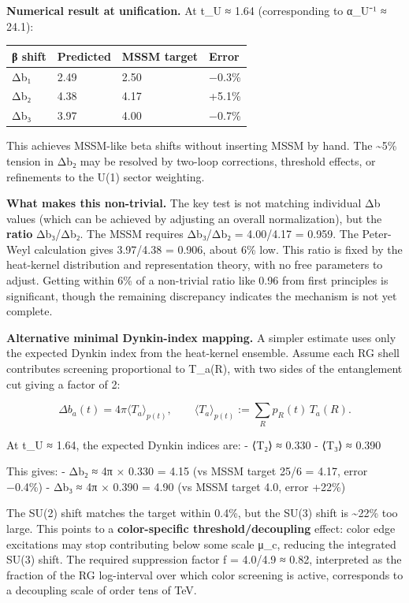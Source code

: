 \documentclass[
]{article}
\newcounter{none} %
\begin{document}
\textbf{Numerical result at unification.} At t\_U ≈ 1.64 (corresponding
to α\_U⁻¹ ≈ 24.1):

{\def\LTcaptype{none} %
\begin{longtable}[]{@{}llll@{}}
\toprule\noalign{}
β shift & Predicted & MSSM target & Error \\
\midrule\noalign{}
\endhead
\bottomrule\noalign{}
\endlastfoot
Δb₁ & 2.49 & 2.50 & −0.3\% \\
Δb₂ & 4.38 & 4.17 & +5.1\% \\
Δb₃ & 3.97 & 4.00 & −0.7\% \\
\end{longtable}
}

This achieves MSSM-like beta shifts without inserting MSSM by hand. The
\textasciitilde5\% tension in Δb₂ may be resolved by two-loop
corrections, threshold effects, or refinements to the U(1) sector
weighting.

\textbf{What makes this non-trivial.} The key test is not matching
individual Δb values (which can be achieved by adjusting an overall
normalization), but the \textbf{ratio} Δb₃/Δb₂. The MSSM requires
Δb₃/Δb₂ = 4.00/4.17 = 0.959. The Peter-Weyl calculation gives 3.97/4.38
= 0.906, about 6\% low. This ratio is fixed by the heat-kernel
distribution and representation theory, with no free parameters to
adjust. Getting within 6\% of a non-trivial ratio like 0.96 from first
principles is significant, though the remaining discrepancy indicates
the mechanism is not yet complete.

\textbf{Alternative minimal Dynkin-index mapping.} A simpler estimate
uses only the expected Dynkin index from the heat-kernel ensemble.
Assume each RG shell contributes screening proportional to T\_a(R), with
two sides of the entanglement cut giving a factor of 2:

\[
\Delta b_a(t) = 4\pi \langle T_a \rangle_{p(t)}, \qquad
\langle T_a \rangle_{p(t)} := \sum_R p_R(t) \, T_a(R).
\]

At t\_U ≈ 1.64, the expected Dynkin indices are: - ⟨T₂⟩ ≈ 0.330 - ⟨T₃⟩ ≈
0.390

This gives: - Δb₂ ≈ 4π × 0.330 = 4.15 (vs MSSM target 25/6 = 4.17, error
−0.4\%) - Δb₃ ≈ 4π × 0.390 = 4.90 (vs MSSM target 4.0, error +22\%)

The SU(2) shift matches the target within 0.4\%, but the SU(3) shift is
\textasciitilde22\% too large. This points to a \textbf{color-specific
threshold/decoupling} effect: color edge excitations may stop
contributing below some scale μ\_c, reducing the integrated SU(3) shift.
The required suppression factor f = 4.0/4.9 ≈ 0.82, interpreted as the
fraction of the RG log-interval over which color screening is active,
corresponds to a decoupling scale of order tens of TeV.
\end{document}
